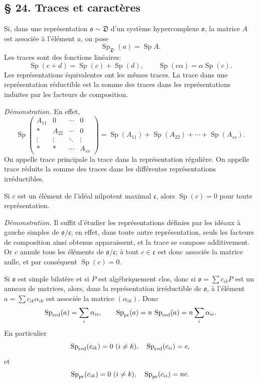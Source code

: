 
\providecommand{\mo}{\mathfrak{o}}
\providecommand{\mc}{\mathfrak{c}}
\providecommand{\mM}{\mathfrak{M}}
\providecommand{\mR}{\mathfrak{R}}

\subsection*{\S{} 24. Traces et caractères}
Si, dans une représentation $\mo\sim\mathfrak D$ d'un système hypercomplexe $\mo$, la matrice $A$ est associée à l'élément $a$, on pose
\[
        \operatorname{Sp}_{\mathfrak D}(a)=\operatorname{Sp} A.
\]
Les traces sont des fonctions linéaires:
\[
        \operatorname{Sp}(c+d)=\operatorname{Sp}(c)+\operatorname{Sp}(d),
        \qquad
        \operatorname{Sp}(c\alpha)=\alpha\operatorname{Sp}(c).
\]
Les représentations équivalentes ont les mêmes traces. La trace dans une représentation réductible est la somme des traces dans les représentations induites par les facteurs de composition.

\emph{Démonstration.} En effet,
\[
        \operatorname{Sp}\begin{pmatrix}
        A_{11}&0&\cdots&0\\
        *&A_{22}&\cdots&0\\
        \vdots&\vdots&\ddots&\vdots\\
        *&*&\cdots&A_{ss}
        \end{pmatrix}
        =\operatorname{Sp}(A_{11})+\operatorname{Sp}(A_{22})+\cdots+\operatorname{Sp}(A_{ss}).
\]
On appelle trace principale la trace dans la représentation régulière. On appelle trace réduite la somme des traces dans les différentes représentations irréductibles.

Si $c$ est un élément de l'idéal nilpotent maximal $\mc$, alors $\operatorname{Sp}(c)=0$ pour toute représentation.

\emph{Démonstration.} Il suffit d'étudier les représentations définies par les idéaux à gauche simples de $\mo/\mc$; en effet, dans toute autre représentation, seuls les facteurs de composition ainsi obtenus apparaissent, et la trace se compose additivement. Or $c$ annule tous les éléments de $\mo/\mc$; à tout $c\in\mc$ est donc associée la matrice nulle, et par conséquent $\operatorname{Sp}(c)=0$.

Si $\mo$ est simple bilatère et si $P$ est algébriquement clos, donc si $\mo=\sum c_{ik}P$ est un anneau de matrices, alors, dans la représentation irréductible de $\mo$, à l'élément $a=\sum c_{ik}\alpha_{ik}$ est associée la matrice $(\alpha_{ik})$. Donc
\[
        \operatorname{Sp}_{\rm red}(a)=\sum_i\alpha_{ii},
        \qquad
        \operatorname{Sp}_{\rm pr}(a)=n\,\operatorname{Sp}_{\rm red}(a)=n\sum_i\alpha_{ii}.
\]
En particulier
\[
        \operatorname{Sp}_{\rm red}(c_{ik})=0\ (i\ne k),\quad
        \operatorname{Sp}_{\rm red}(c_{ii})=e,
\]
et
\[
        \operatorname{Sp}_{\rm pr}(c_{ik})=0\ (i\ne k),\quad
        \operatorname{Sp}_{\rm pr}(c_{ii})=n e.
\]

